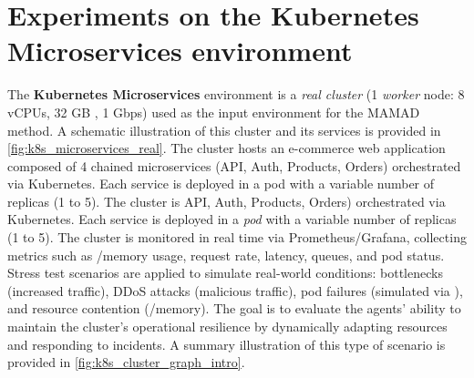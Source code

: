 
\section{Experiments on the Kubernetes Microservices environment}


The \textbf{Kubernetes Microservices} environment is a \emph{real cluster} (1 \textit{worker} node: 8 vCPUs, 32 GB , 1 Gbps) used as the input environment for the MAMAD method. A schematic illustration of this cluster and its services is provided in \autoref{fig:k8s_microservices_real}. The cluster hosts an e-commerce web application composed of 4 chained microservices (API, Auth, Products, Orders) orchestrated via Kubernetes. Each service is deployed in a pod with a variable number of replicas (1 to 5). The cluster is {API}, Auth, Products, Orders) orchestrated via Kubernetes. Each service is deployed in a \emph{pod} with a variable number of replicas (1 to 5). The cluster is monitored in real time via Prometheus/Grafana, collecting metrics such as /memory usage, request rate, latency, queues, and pod status. Stress test scenarios are applied to simulate real-world conditions: bottlenecks (increased traffic), DDoS attacks (malicious traffic), pod failures (simulated via ), and resource contention (/memory). The goal is to evaluate the agents' ability to maintain the cluster's operational resilience by dynamically adapting resources and responding to incidents. A summary illustration of this type of scenario is provided in \autoref{fig:k8s_cluster_graph_intro}.



